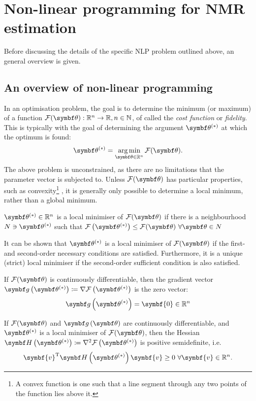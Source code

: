 \section{Non-linear programming for NMR estimation}
Before discussing the details of the specific \ac{NLP} problem outlined above,
an general overview is given.

\subsection{An overview of non-linear programming}
\label{subsec:nlp-overview}
In an optimisation problem, the goal is to determine the minimum (or maximum)
of a function $\Fth: \mathbb{R}^n \rightarrow \mathbb{R}, n \in \mathbb{N}$, of
called the \emph{cost function} or \emph{fidelity}.
This is typically with the goal of determining the argument $\bthstar$ at
which the optimum is found:
\begin{equation}
    \bthstar = \argmin_{\bth \in \mathbb{R}^n} \Fth.
\end{equation}
The above problem is unconstrained, as there are no limitations that the
parameter vector is subjected to. Unless $\Fth$ has particular properties, such
as convexity\footnote{
    A convex function is one such that a line segment through any two points of
    the function lies above it.
}
, it is generally only possible to determine a local minimum,
rather than a global minimum.
\begin{definition}
  $\bthstar \in \mathbb{R}^n$ is a local minimiser of $\Fth$ if there is a neighbourhood $N \ni \bthstar$ such that $\Fthstar \leq \Fth\ \forall \bth \in N$
  \label{def:local-minimiser}
\end{definition}
It can be shown that $\bthstar$ is a local minimiser of $\Fth$ if the first-
and second-order necessary conditions are satisfied. Furthermore, it is a
unique (strict) local minimiser if the second-order sufficient condition is
also satisfied.
\begin{theorem}
\label{theo:first-necessary}
    If $\Fth$ is continuously differentiable, then the gradient vector
    $\bdgthstar \coloneq \nabla \Fthstar$ is the zero vector:
    \begin{equation}
        \bdgthstar = \symbf{0} \in \mathbb{R}^n
    \end{equation}
\end{theorem}
\begin{theorem}
  If $\Fth$ and $\bdgth$ are continuously differentiable, and $\bthstar$ is a
  local minimiser of $\Fth$, then the Hessian $\bdHthstar \coloneq \nabla^2
  \Fthstar$ is positive semidefinite, i.e.
  \begin{equation}
      \symbf{v}^{\mathrm{T}} \bdHthstar \symbf{v} \geq 0\ \forall \symbf{v} \in \mathbb{R}^n.
  \end{equation}
\end{theorem}
